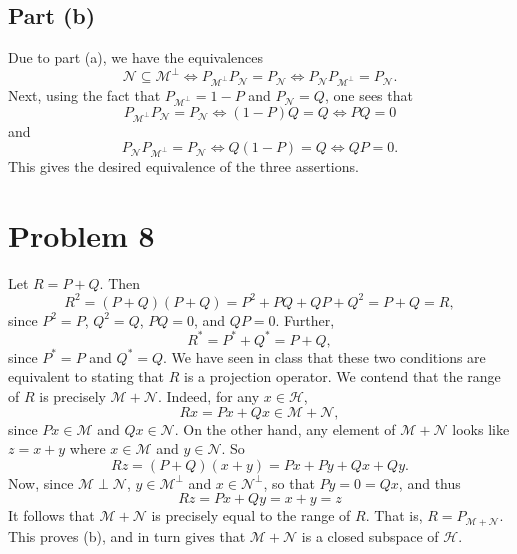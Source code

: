 \documentclass[10pt]{amsart}
\theoremstyle{thmstyle}
\theoremstyle{defstyle}
\newcommand{\calH}{\mathcal{H}} %
\newcommand{\calM}{\mathcal{M}}
\newcommand{\calN}{\mathcal{N}}
\begin{document}
\subsection{Part (b)}

Due to part (a), we have the equivalences
\begin{equation*}
    \calN\subseteq\calM^\perp\iff P_{\calM^\perp}P_{\calN} = P_{\calN}\iff P_{\calN}P_{\calM^\perp} = P_{\calN}.
\end{equation*}
Next, using the fact that $P_{\calM^\perp} = 1 - P$ and $P_{\calN} = Q$, one sees that 
\begin{equation*}
    P_{\calM^\perp}P_{\calN} = P_{\calN}\iff (1 - P)Q = Q\iff PQ = 0
\end{equation*}
and 
\begin{equation*}
    P_{\calN}P_{\calM^\perp} = P_{\calN}\iff Q(1 - P) = Q\iff QP = 0.
\end{equation*}
This gives the desired equivalence of the three assertions.

\section{Problem 8}

Let $R = P + Q$. Then 
\begin{equation*}
    R^2 = (P + Q)(P + Q) = P^2 + PQ + QP + Q^2 = P + Q = R,
\end{equation*}
since $P^2 = P$, $Q^2 = Q$, $PQ = 0$, and $QP = 0$. Further, 
\begin{equation*}
    R^\ast = P^\ast + Q^\ast = P + Q,
\end{equation*}
since $P^\ast = P$ and $Q^\ast = Q$. We have seen in class that these two conditions are equivalent to stating that $R$ is a projection operator. We contend that the range of $R$ is precisely $\calM + \calN$. Indeed, for any $x\in\calH$, 
\begin{equation*}
    Rx = Px + Qx\in\calM + \calN,
\end{equation*}
since $Px\in\calM$ and $Qx\in\calN$. On the other hand, any element of $\calM + \calN$ looks like $z = x + y$ where $x\in\calM$ and $y\in\calN$. So 
\begin{equation*}
    Rz = (P + Q)(x + y) = Px + Py + Qx + Qy.
\end{equation*}
Now, since $\calM\perp\calN$, $y\in\calM^\perp$ and $x\in\calN^\perp$, so that $Py = 0 = Qx$, and thus 
\begin{equation*}
    Rz = Px + Qy = x + y = z
\end{equation*}
It follows that $\calM + \calN$ is precisely equal to the range of $R$. That is, $R = P_{\calM + \calN}$. This proves (b), and in turn gives that $\calM + \calN$ is a closed subspace of $\calH$.
\end{document}
